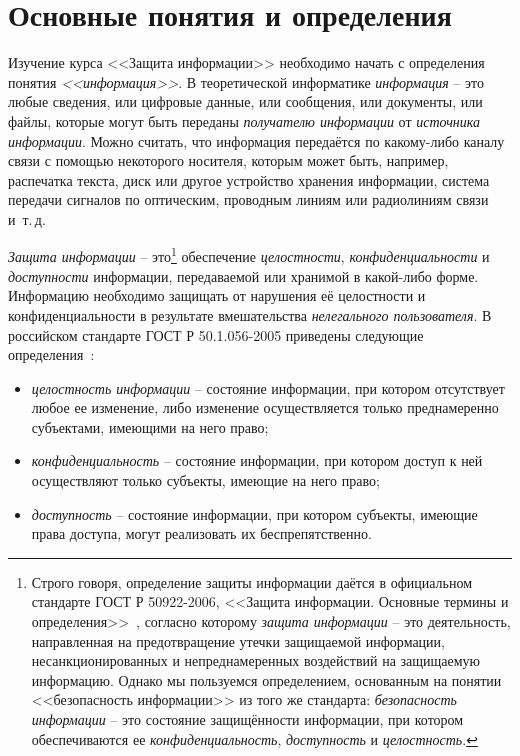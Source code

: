 \chapter{Основные понятия и определения}

Изучение курса <<Защита информации>> необходимо начать с определения понятия \emph{<<информация>>}. В теоретической информатике \emph{информация} -- это любые сведения, или цифровые данные, или сообщения, или документы, или файлы, которые могут быть переданы \emph{получателю информации} от \emph{источника информации}. Можно считать, что информация передаётся по какому-либо каналу связи с помощью некоторого носителя, которым может быть, например, распечатка текста, диск или другое устройство хранения информации, система передачи сигналов по оптическим, проводным линиям или радиолиниям связи и~т.\,д.

\emph{Защита информации} -- это\footnote{Строго говоря, определение защиты информации даётся в официальном стандарте ГОСТ Р 50922-2006, <<Защита информации. Основные термины и определения>>~\cite{GOST-50922-2006}, согласно которому \emph{защита информации} -- это деятельность, направленная на предотвращение утечки защищаемой информации, несанкционированных и непреднамеренных воздействий на защищаемую информацию. Однако мы пользуемся определением, основанным на понятии <<безопасность информации>> из того же стандарта: \emph{безопасность информации} -- это состояние защищённости информации, при котором обеспечиваются ее \emph{конфиденциальность}, \emph{доступность} и \emph{целостность}.} обеспечение \emph{целостности}, \emph{конфиденциальности} и \emph{доступности} информации, передаваемой или хранимой в какой-либо форме. Информацию необходимо защищать от нарушения её целостности и конфиденциальности в результате вмешательства \emph{нелегального пользователя}. В российском стандарте ГОСТ Р 50.1.056-2005 приведены следующие определения~\cite{GOST-2005}:
\begin{itemize}
	\item \emph{целостность информации} -- состояние информации, при котором отсутствует любое ее изменение, либо изменение осуществляется только преднамеренно субъектами, имеющими на него право;
	\item \emph{конфиденциальность} -- состояние информации, при котором доступ к ней осуществляют только субъекты, имеющие на него право;
	\item \emph{доступность} -- состояние информации, при котором субъекты, имеющие права доступа, могут реализовать их беспрепятственно.
\end{itemize}


